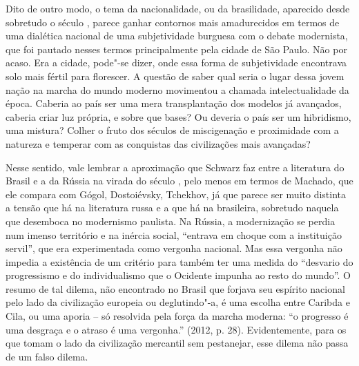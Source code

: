 Dito de outro modo, o tema da nacionalidade, ou da brasilidade,
aparecido desde sobretudo o século , parece ganhar contornos mais
amadurecidos em termos de uma dialética nacional de uma subjetividade
burguesa com o debate modernista, que foi pautado nesses termos
principalmente pela cidade de São Paulo. Não por acaso. Era a cidade,
pode"-se dizer, onde essa forma de subjetividade encontrava solo mais
fértil para florescer. A questão de saber qual seria o lugar dessa jovem
nação na marcha do mundo moderno movimentou a chamada intelectualidade
da época. Caberia ao país ser uma mera transplantação dos modelos já
avançados, caberia criar luz própria, e sobre que bases? Ou deveria o
país ser um hibridismo, uma mistura? Colher o fruto dos séculos de
miscigenação e proximidade com a natureza e temperar com as conquistas
das civilizações mais avançadas?

Nesse sentido, vale lembrar a aproximação que Schwarz faz entre a
literatura do Brasil e a da Rússia na virada do século , pelo menos em
termos de Machado, que ele compara com Gógol, Dostoiévsky, Tchekhov, já
que parece ser muito distinta a tensão que há na literatura russa e a
que há na brasileira, sobretudo naquela que desemboca no modernismo
paulista. Na Rússia, a modernização se perdia num imenso território e na
inércia social, ``entrava em choque com a instituição servil'', que era
experimentada como vergonha nacional. Mas essa vergonha não impedia a
existência de um critério para também ter uma medida do ``desvario do
progressismo e do individualismo que o Ocidente impunha ao resto do
mundo''. O resumo de tal dilema, não encontrado no Brasil que forjava
seu espírito nacional pelo lado da civilização europeia ou deglutindo"-a,
é uma escolha entre Caribda e Cila, ou uma aporia -- só resolvida pela
força da marcha moderna: ``o progresso é uma desgraça e o atraso é uma
vergonha.'' (2012, p. 28). Evidentemente, para os que tomam o lado da
civilização mercantil sem pestanejar, esse dilema não passa de um falso
dilema.

